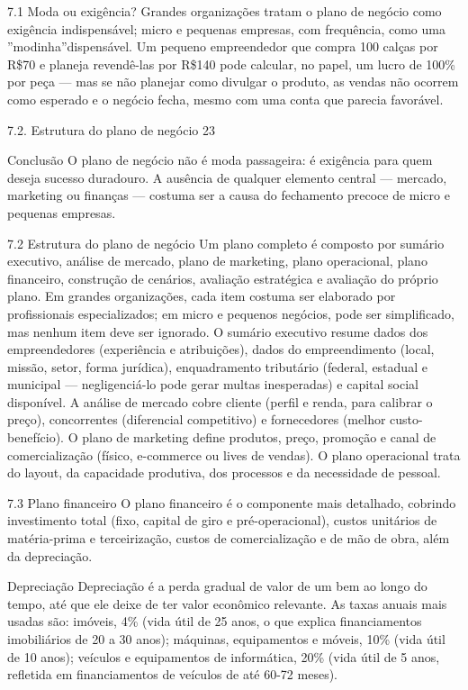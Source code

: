 7.1 Moda ou exigência? Grandes organizações tratam o plano de negócio como exigência indispensável; micro e pequenas empresas, com frequência, como uma ”modinha”dispensável. Um pequeno empreendedor que compra 100 calças por R\$70 e planeja revendê-las por R\$140 pode calcular, no papel, um lucro de 100\% por peça — mas se não planejar como divulgar o produto, as vendas não ocorrem como esperado e o negócio fecha, mesmo com uma conta que parecia favorável.

7.2. Estrutura do plano de negócio 23

Conclusão O plano de negócio não é moda passageira: é exigência para quem deseja sucesso duradouro. A ausência de qualquer elemento central — mercado, marketing ou finanças — costuma ser a causa do fechamento precoce de micro e pequenas empresas.

7.2 Estrutura do plano de negócio Um plano completo é composto por sumário executivo, análise de mercado, plano de marketing, plano operacional, plano financeiro, construção de cenários, avaliação estratégica e avaliação do próprio plano. Em grandes organizações, cada item costuma ser elaborado por profissionais especializados; em micro e pequenos negócios, pode ser simplificado, mas nenhum item deve ser ignorado. O sumário executivo resume dados dos empreendedores (experiência e atribuições), dados do empreendimento (local, missão, setor, forma jurídica), enquadramento tributário (federal, estadual e municipal — negligenciá-lo pode gerar multas inesperadas) e capital social disponível. A análise de mercado cobre cliente (perfil e renda, para calibrar o preço), concorrentes (diferencial competitivo) e fornecedores (melhor custo-benefício). O plano de marketing define produtos, preço, promoção e canal de comercialização (físico, e-commerce ou lives de vendas). O plano operacional trata do layout, da capacidade produtiva, dos processos e da necessidade de pessoal.

7.3 Plano financeiro O plano financeiro é o componente mais detalhado, cobrindo investimento total (fixo, capital de giro e pré-operacional), custos unitários de matéria-prima e terceirização, custos de comercialização e de mão de obra, além da depreciação.

Depreciação Depreciação é a perda gradual de valor de um bem ao longo do tempo, até que ele deixe de ter valor econômico relevante. As taxas anuais mais usadas são: imóveis, 4\% (vida útil de 25 anos, o que explica financiamentos imobiliários de 20 a 30 anos); máquinas, equipamentos e móveis, 10\% (vida útil de 10 anos); veículos e equipamentos de informática, 20\% (vida útil de 5 anos, refletida em financiamentos de veículos de até 60-72 meses).

